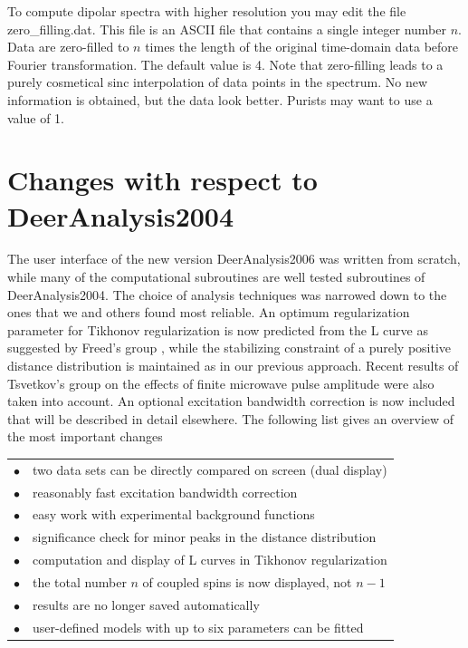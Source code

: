 \documentclass{article}
\begin{document}
To compute dipolar spectra with higher resolution you may edit the file {\ttfamily zero\_filling.dat}. This file is an ASCII file that contains a single integer number $n$. Data are zero-filled to $n$ times the length of the original time-domain data before Fourier transformation. The default value is 4. Note that zero-filling leads to a purely cosmetical sinc interpolation of data points in the spectrum. No new information is obtained, but the data look better. Purists may want to use a value of 1.

\section{Changes with respect to DeerAnalysis2004}
\label{changes}

The user interface of the new version DeerAnalysis2006 was written from scratch, while many of the computational subroutines are well tested subroutines of DeerAnalysis2004. The choice of analysis techniques was narrowed down to the ones that we and others found most reliable. An optimum regularization parameter for Tikhonov regularization is now predicted from the L curve as suggested by Freed's group \cite{freed2005}, while the stabilizing constraint of a purely positive distance distribution is maintained as in our previous approach. Recent results of Tsvetkov's group on the effects of finite microwave pulse amplitude \cite{maryasov2000,milov2004} were also taken into account. An optional excitation bandwidth correction is now included that will be described in detail elsewhere. The following list gives an overview of the most important changes    

\begin{tabular}{ll}
\noalign{\smallskip}
$\bullet$ & two data sets can be directly compared on screen (dual display) \\
$\bullet$ & reasonably fast excitation bandwidth correction\\
$\bullet$ & easy work with experimental background functions\\
$\bullet$ & significance check for minor peaks in the distance distribution\\
$\bullet$ & computation and display of L curves in Tikhonov regularization\\
$\bullet$ & the total number $n$ of coupled spins is now displayed, not $n-1$\\
$\bullet$ & results are no longer saved automatically\\
$\bullet$ & user-defined models with up to six parameters can be fitted\\
\end{tabular}
\end{document}
